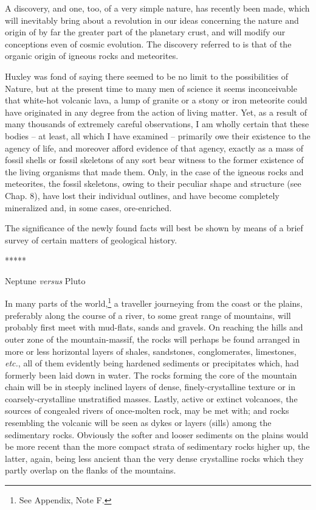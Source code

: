 \documentclass[a4paper, 12pt, oneside]{article}
\begin{document}
A discovery, and one, too, of a very simple nature, has recently been made, which will inevitably bring about a revolution in our ideas concerning the nature and origin of by far the greater part of the planetary crust, and will modify our conceptions even of cosmic evolution. The discovery referred to is that of the organic origin of igneous rocks and meteorites.

Huxley was fond of saying there seemed to be no limit to the possibilities of Nature, but at the present time to many men of science it seems inconceivable that white-hot volcanic lava, a lump of granite or a stony or iron meteorite could have originated in any degree from the action of living matter. Yet, as a result of many thousands of extremely careful observations, I am wholly certain that these bodies -- at least, all which I have examined -- primarily owe their existence to the agency of life, and moreover afford evidence of that agency, exactly as a mass of fossil shells or fossil skeletons of any sort bear witness to the former existence of the living organisms that made them. Only, in the case of the igneous rocks and meteorites, the fossil skeletons, owing to their peculiar shape and structure (see Chap. 8), have lost their individual outlines, and have become completely mineralized and, in some cases, ore-enriched.

The significance of the newly found facts will best be shown by means of a brief survey of certain matters of geological history.

\centerline{*\hspace{15mm}*\hspace{15mm}*\hspace{15mm}*\hspace{15mm}*}
\bigskip

\centerline{Neptune \emph{versus} Pluto}

In many parts of the world,\footnote{See Appendix, Note F.} a traveller journeying from the coast or the plains, preferably along the course of a river, to some great range of mountains, will probably first meet with mud-flats, sands and gravels. On reaching the hills and outer zone of the mountain-massif, the rocks will perhaps be found arranged in more or less horizontal layers of shales, sandstones, conglomerates, limestones, \emph{etc.}, all of them evidently being hardened sediments or precipitates which, had formerly been laid down in water. The rocks forming the core of the mountain chain will be in steeply inclined layers of dense, finely-crystalline texture or in coarsely-crystalline unstratified masses. Lastly, active or extinct volcanoes, the sources of congealed rivers of once-molten rock, may be met with; and rocks resembling the volcanic will be seen as dykes or layers (sills) among the sedimentary rocks. Obviously the softer and looser sediments on the plains would be more recent than the more compact strata of sedimentary rocks higher up, the latter, again, being less ancient than the very dense crystalline rocks which they partly overlap on the flanks of the mountains.
\end{document}
